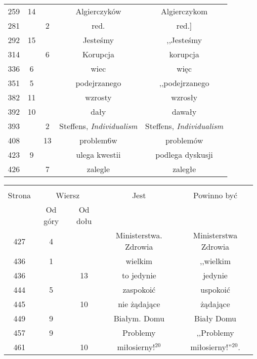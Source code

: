 \documentclass[a4paper,11pt]{article}
\begin{document}
\begin{center}
\begin{tabular}{|c|c|c|c|c|}
    259 & 14 & & Algierczyków & Algierczykom \\
    281 & &  2 & red. & red.] \\
    292 & 15 & & Jesteśmy & ,,Jesteśmy  %
    \\
    314 & &  6 & Korupcja & korupcja \\
    336 &  6 & & wiec & więc \\
    351 &  5 & & podejrzanego & ,,podejrzanego  %
    \\
    382 & 11 & & wzrosty & wzrosły \\
    392 & 10 & & dały & dawały \\
    393 & &  2 & Steffens,{ }{ }\emph{Individualism}
           & Steffens, \emph{Individualism} \\
    408 & & 13 & problem6w & problemów \\
    423 &  9 & & ulega kwestii & podlega dyskusji \\
    426 & &  7 & zalegle & zaległe \\
    \hline
  \end{tabular}

  \begin{tabular}{|c|c|c|c|c|}
    \hline
    & \multicolumn{2}{c|}{} & & \\
    Strona & \multicolumn{2}{c|}{Wiersz} & Jest
                              & Powinno być \\ \cline{2-3}
    & Od góry & Od dołu & & \\
    \hline
    427 &  4 & & Ministerstwa. Zdrowia & Ministerstwa Zdrowia \\
    436 &  1 & & wielkim & ,,wielkim  %
    \\
    436 & & 13 & to jedynie & jedynie \\
    444 &  5 & & zaspokoić & uspokoić \\
    445 & & 10 & nie żądające & żądające \\
    449 &  9 & & Białym. Domu & Biały Domu \\
    457 &  9 & & Problemy & ,,Problemy  %
    \\
    461 & & 10 & miłosierny!$^{ 20 }$ & miłosierny!''$^{ 20 }$. \\
    \hline
  \end{tabular}


\end{center}
\end{document}
